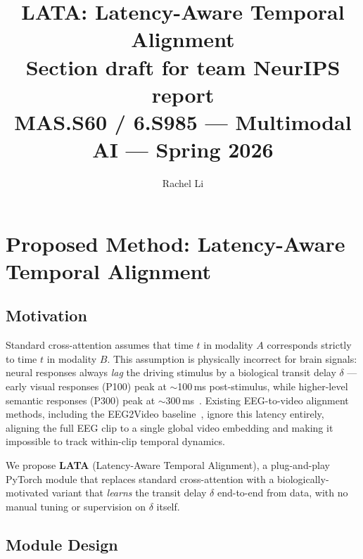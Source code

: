 \documentclass[11pt]{article}
\title{\textbf{LATA: Latency-Aware Temporal Alignment}\\
\large Section draft for team NeurIPS report\\
\normalsize MAS.S60 / 6.S985 --- Multimodal AI --- Spring 2026}
\author{Rachel Li}
\date{}
\begin{document}
\maketitle
\tableofcontents
\newpage

\section{Proposed Method: Latency-Aware Temporal Alignment}

\subsection{Motivation}

Standard cross-attention assumes that time $t$ in modality $A$ corresponds
strictly to time $t$ in modality $B$.
This assumption is physically incorrect for brain signals: neural responses
always \emph{lag} the driving stimulus by a biological transit delay
$\delta$ — early visual responses (P100) peak at $\sim$100\,ms
post-stimulus, while higher-level semantic responses (P300) peak at
$\sim$300\,ms~\cite{luck2014introduction}.
Existing EEG-to-video alignment methods, including the EEG2Video
baseline~\cite{liu2024eeg2video}, ignore this latency entirely, aligning
the full EEG clip to a single global video embedding and making it
impossible to track within-clip temporal dynamics.

We propose \textbf{LATA} (Latency-Aware Temporal Alignment), a
plug-and-play PyTorch module that replaces standard cross-attention with a
biologically-motivated variant that \emph{learns} the transit delay
$\delta$ end-to-end from data, with no manual tuning or supervision on
$\delta$ itself.

\subsection{Module Design}
\end{document}
